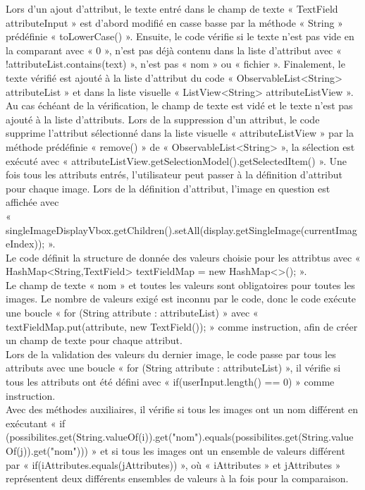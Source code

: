 \documentclass[a4paper]{article}
\begin{document}
Lors d’un ajout d’attribut, le texte entré dans le champ de texte « TextField attributeInput » est d’abord modifié en casse basse par la méthode « String » prédéfinie « toLowerCase() ». Ensuite, le code vérifie si le texte n’est pas vide en la comparant avec « 0 », n’est pas déjà contenu dans la liste d’attribut avec « !attributeList.contains(text) », n’est pas « nom » ou « fichier ». Finalement, le texte vérifié est ajouté à la liste d’attribut du code « ObservableList<String> attributeList » et dans la liste visuelle « ListView<String> attributeListView ». Au cas échéant de la vérification, le champ de texte est vidé et le texte n’est pas ajouté à la liste d’attributs. Lors de la suppression d’un attribut, le code supprime l’attribut sélectionné dans la liste visuelle « attributeListView » par la méthode prédéfinie « remove() » de « ObservableList<String> », la sélection est exécuté avec « attributeListView.getSelectionModel().getSelectedItem() ». Une fois tous les attributs entrés, l’utilisateur peut passer à la définition d’attribut pour chaque image. Lors de la définition d’attribut, l’image en question est affichée avec \\« singleImageDisplayVbox.getChildren().setAll(display.getSingleImage(currentImageIndex)); ».\\
Le code définit la structure de donnée des valeurs choisie pour les attribtus avec « HashMap<String,TextField> textFieldMap = new HashMap<>(); ».\\
Le champ de texte « nom » et toutes les valeurs sont obligatoires pour toutes les images. Le nombre de valeurs exigé est inconnu par le code, donc le code exécute une boucle « for (String attribute : attributeList) » avec « textFieldMap.put(attribute, new TextField()); » comme instruction, afin de créer un champ de texte pour chaque attribut.\\
Lors de la validation des valeurs du dernier image, le code passe par tous les attributs avec une boucle « for (String attribute : attributeList) », il vérifie si tous les attributs ont été défini avec « if(userInput.length() == 0) » comme instruction.\\ Avec des méthodes auxiliaires, il vérifie si tous les images ont un nom différent en exécutant « if (possibilites.get(String.valueOf(i)).get("nom").equals(possibilites.get(String.valueOf(j)).get("nom"))) » et si tous les images ont un ensemble de valeurs différent par « if(iAttributes.equals(jAttributes)) », où « iAttributes » et jAttributes » représentent deux différents ensembles de valeurs à la fois pour la comparaison.\\
\end{document}
